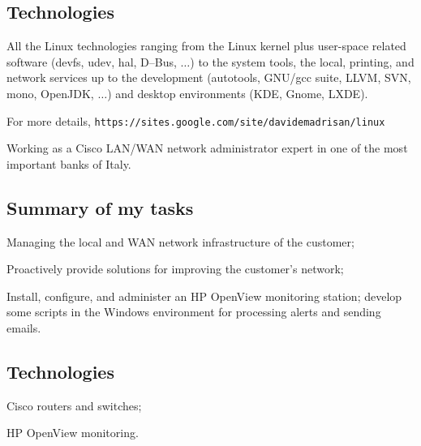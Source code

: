 \subsection{Technologies}

\vskip 0pt\noindent
All the Linux technologies ranging from the Linux kernel plus user-space 
related software (devfs, udev, hal, D--Bus, $\dots$) to the system tools, the local,
printing, and network services up to the development (autotools, GNU/gcc suite, 
LLVM, SVN, mono, OpenJDK, $\dots$) and desktop environments (KDE, Gnome, LXDE).

For more details,
\hfill\break\noindent
{\tt https:/\negthinspace/sites.google.com/site/davidemadrisan/linux}


\vfill\eject


Working as a Cisco LAN/WAN network administrator expert in one of the most
important banks of Italy.

\subsection{Summary of my tasks}

\item{\bdot} Managing the local and WAN network infrastructure of the customer;
\item{\bdot} Proactively provide solutions for improving the customer's network;
\item{\bdot} Install, configure, and administer an HP OpenView monitoring station;
             develop some scripts in the Windows environment for processing alerts
             and sending emails.

\subsection{Technologies}

\item{\bdot} Cisco routers and switches;
\item{\bdot} HP OpenView monitoring.
 


